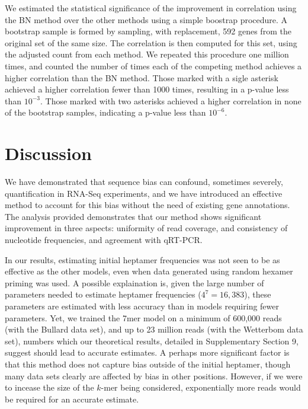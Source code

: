 \documentclass{bioinfo}
\begin{document}
\begin{table}
{
We estimated the statistical significance of the improvement in correlation
using the BN method over the other methods using a simple boostrap procedure. A
bootstrap sample is formed by sampling, with replacement, 592 genes from the
original set of the same size. The correlation is then computed for this set,
using the adjusted count from each method. We repeated this procedure one
million times, and counted the number of times each of the competing method achieves a
higher correlation than the BN method.  Those marked with a sigle asterisk
achieved a higher correlation fewer than 1000 times, resulting in a p-value
less than $10^{-3}$.  Those marked with two asterisks achieved a higher
correlation in none of the bootstrap samples, indicating a p-value less than
$10^{-6}$.
}
\end{table}



\section{Discussion}

We have demonstrated that sequence bias can confound, sometimes severely,
quantification in RNA-Seq experiments, and we have introduced an effective
method to account for this bias without the need of existing gene annotations.
The analysis provided demonstrates that our method shows significant improvement
in three aspects: uniformity of read coverage, and consistency of nucleotide
frequencies, and agreement with qRT-PCR.

In our results, estimating initial heptamer frequencies was not seen to be as
effective as the other models, even when data generated using random hexamer
priming was used. A possible explaination is, given the large number of
parameters needed to estimate heptamer frequencies ($4^{7} = 16,383$), these
parameters are estimated with less accuracy than in models requiring fewer
parameters. Yet, we trained the 7mer model on a minimum of 600,000 reads (with
the Bullard data set), and up to 23 million reads (with the Wetterbom data set),
numbers which our theoretical results, detailed in Supplementary Section 9,
suggest should lead to accurate estimates. A perhaps more significant factor is
that this method does not capture bias outside of the initial heptamer, though
many data sets clearly are affected by bias in other positions.  However, if we
were to incease the size of the $k$-mer being considered, exponentially more
reads would be required for an accurate estimate.
\end{document}
